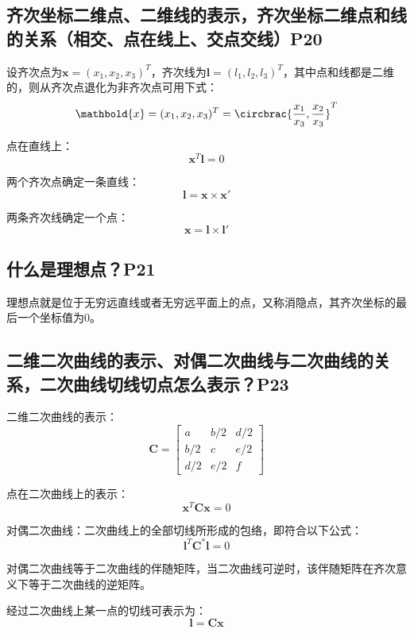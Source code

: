 \documentclass[11pt]{article}
\begin{document}
\subsection{齐次坐标二维点、二维线的表示，齐次坐标二维点和线的关系（相交、点在线上、交点交线）P20}
设齐次点为$\mathbold{x}=(x_1,x_2,x_3)^T$，齐次线为$\mathbold{l}=(l_1,l_2,l_3)^T$，其中点和线都是二维的，则从齐次点退化为非齐次点可用下式：
\begin{equation*}
  \mathbold{x}=(x_1,x_2,x_3)^T=\circbrac{\frac{x_1}{x_3},\frac{x_2}{x_3}}^T
\end{equation*}\par
点在直线上：
\begin{equation*}
  \mathbold{x}^T\mathbold{l}=0
\end{equation*}\par
两个齐次点确定一条直线：
\begin{equation*}
  \mathbold{l}=\mathbold{x}\times\mathbold{x}'
\end{equation*}\par
两条齐次线确定一个点：
\begin{equation*}
  \mathbold{x}=\mathbold{l}\times\mathbold{l}'
\end{equation*}\par
\subsection{什么是理想点？P21}
理想点就是位于无穷远直线或者无穷远平面上的点，又称消隐点，其齐次坐标的最后一个坐标值为0。
\subsection{二维二次曲线的表示、对偶二次曲线与二次曲线的关系，二次曲线切线切点怎么表示？P23}
二维二次曲线的表示：
\begin{equation*}
  \mathbold{C}=\begin{bmatrix}
    a   & b/2 & d/2 \\
    b/2 & c   & e/2 \\
    d/2 & e/2 & f
  \end{bmatrix}
\end{equation*}\par
点在二次曲线上的表示：
\begin{equation*}
  \mathbold{x}^T\mathbold{C}\mathbold{x}=0
\end{equation*}\par
对偶二次曲线：二次曲线上的全部切线所形成的包络，即符合以下公式：
\begin{equation*}
  \mathbold{l}^T\mathbold{C}^*\mathbold{l}=0
\end{equation*}\par
对偶二次曲线等于二次曲线的伴随矩阵，当二次曲线可逆时，该伴随矩阵在齐次意义下等于二次曲线的逆矩阵。\par
经过二次曲线上某一点的切线可表示为：
\begin{equation*}
  \mathbold{l=Cx}
\end{equation*}
\end{document}
